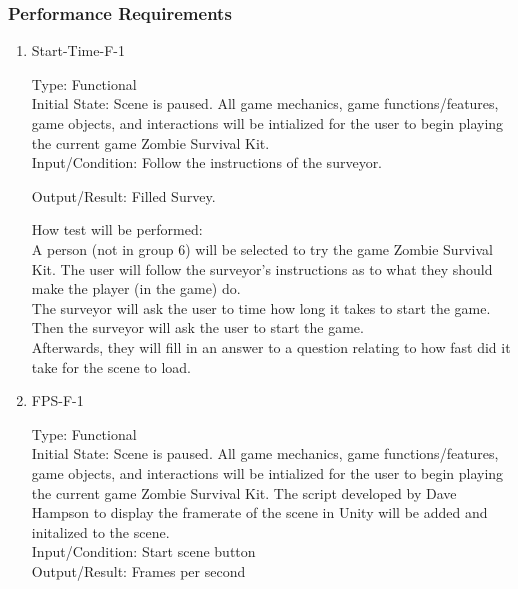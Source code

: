 \documentclass[12pt, titlepage]{article}
\begin{document}
\subsubsection{Performance Requirements}

\begin{enumerate}
	
	\item{Start-Time-F-1\\}
	
	Type: Functional \\
	
	Initial State: Scene is paused. All game mechanics, game functions/features, game objects, and interactions will be intialized for the user to begin playing the current game Zombie Survival Kit. \\
	
	Input/Condition: Follow the instructions of the surveyor.
	
	Output/Result: Filled Survey.
	
	How test will be performed:\\ A person (not in group 6) will be selected to try the game Zombie Survival Kit. The user will follow the surveyor's instructions as to what they should make the player (in the game) do. \\ 
	The surveyor will ask the user to time how long it takes to start the game. Then the surveyor will ask the user to start the game. \\
	Afterwards, they will fill in an answer to a question relating to how fast did it take for the scene to load. \\
	
	\item{FPS-F-1\\}
	
	Type: Functional \\
	
	Initial State: Scene is paused. All game mechanics, game functions/features, game objects, and interactions will be intialized for the user to begin playing the current game Zombie Survival Kit. The script developed by Dave Hampson to display the framerate of the scene in Unity will be added and initalized to the scene. \\
	
	Input/Condition: Start scene button \\
	
	Output/Result: Frames per second \\
	

\end{enumerate}
\end{document}
